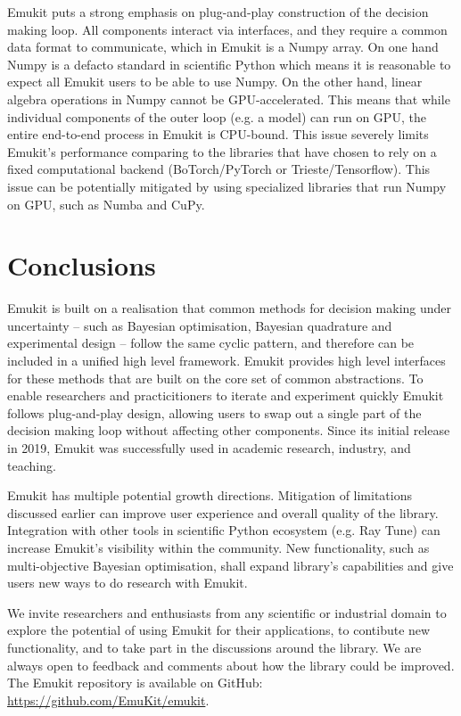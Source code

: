Emukit puts a strong emphasis on plug-and-play construction of the decision making loop. All components interact via interfaces, and they require a common data format to communicate, which in Emukit is a Numpy array. On one hand Numpy is a defacto standard in scientific Python which means it is reasonable to expect all Emukit users to be able to use Numpy. On the other hand, linear algebra operations in Numpy cannot be GPU-accelerated. This means that while individual components of the outer loop  (e.g. a model) can run on GPU, the entire end-to-end process in Emukit is CPU-bound. This issue severely limits Emukit's performance comparing to the libraries that have chosen to rely on a fixed computational backend (BoTorch/PyTorch or Trieste/Tensorflow). This issue can be potentially mitigated by using specialized libraries that run Numpy on GPU, such as Numba and CuPy.

\section{Conclusions}
Emukit is built on a realisation that common methods for decision making under uncertainty -- such as Bayesian optimisation, Bayesian quadrature and experimental design -- follow the same cyclic pattern, and therefore can be included in a unified high level framework. Emukit provides high level interfaces for these methods that are built on the core set of common abstractions. To enable researchers and practicitioners to iterate and experiment quickly Emukit follows plug-and-play design, allowing users to swap out a single part of the decision making loop without affecting other components. Since its initial release in 2019, Emukit was successfully used in academic research, industry, and teaching.

Emukit has multiple potential growth directions. Mitigation of limitations discussed earlier can improve user experience and overall quality of the library. Integration with other tools in scientific Python ecosystem (e.g. Ray Tune) can increase Emukit's visibility within the community. New functionality, such as multi-objective Bayesian optimisation, shall expand library's capabilities and give users new ways to do research with Emukit.

We invite researchers and enthusiasts from any scientific or industrial domain to explore the potential of using Emukit for their applications, to contibute new functionality, and to take part in the discussions around the library. We are always open to feedback and comments about how the library could be improved. The Emukit repository is available on GitHub: \url{https://github.com/EmuKit/emukit}.


